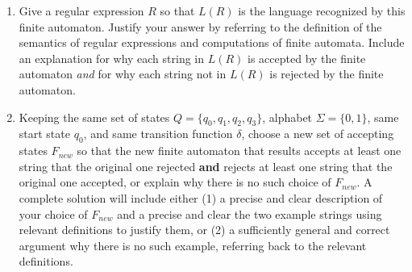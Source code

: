 \begin{enumerate}[wide, labelwidth=!, labelindent=0pt]
\begin{enumerate}
    \item Give a regular expression $R$ so that $L(R)$ is the language 
    recognized by this finite automaton. Justify your answer by referring to the 
    definition of the semantics of regular expressions and computations of finite automata. 
    Include an explanation for why each string in $L(R)$ is accepted by the finite automaton {\it and}
    for why each string not in $L(R)$ is rejected by the finite automaton.

    \item  Keeping the same set of states $Q = \{q_0, q_1, q_2, q_3\}$, alphabet $\Sigma = \{0,1\}$, 
    same start state $q_0$, and same transition 
    function $\delta$, choose a new set of accepting states $F_{new}$ so that the new 
    finite automaton that results accepts at least one string that the original one rejected {\bf and} rejects
    at least one string that the original one accepted, or explain why there is no such choice of $F_{new}$.
    A complete solution will include either (1) a precise and
    clear description of your choice of $F_{new}$
    and a precise and clear the two example strings using relevant definitions 
    to justify them, or (2) a sufficiently general and correct argument
    why there is no such example, referring back to the relevant definitions.

    \end{enumerate}
    
    \end{enumerate}
